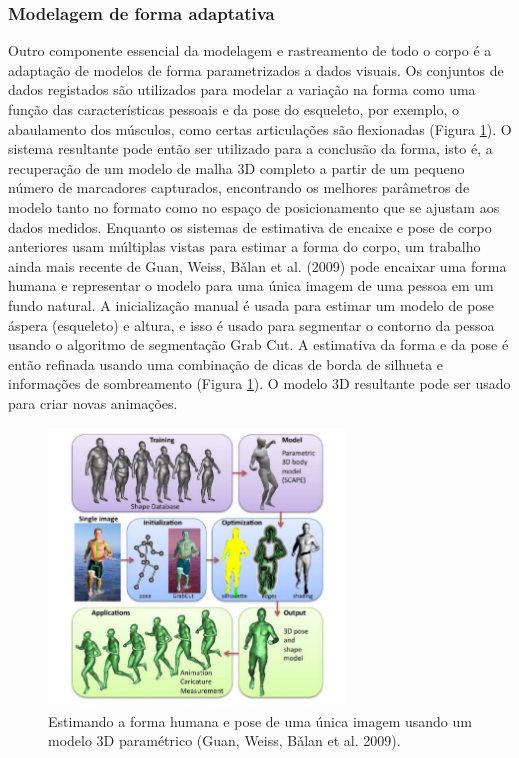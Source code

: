 \documentclass{article}
\begin{document}
\subsubsection{Modelagem de forma adaptativa}
Outro componente essencial da modelagem e rastreamento de todo o corpo é a adaptação de modelos de forma parametrizados a dados visuais. Os conjuntos de dados registados são utilizados para modelar a variação na forma como uma função das características pessoais e da pose do esqueleto, por exemplo, o abaulamento dos músculos, como certas articulações são flexionadas (Figura \ref{fig:img8}). O sistema resultante pode então ser utilizado para a conclusão da forma, isto é, a recuperação de um modelo de malha 3D completo a partir de um pequeno número de marcadores capturados, encontrando os melhores parâmetros de modelo tanto no formato como no espaço de posicionamento que se ajustam aos dados medidos. Enquanto os sistemas de estimativa de encaixe e pose de corpo anteriores usam múltiplas vistas para estimar a forma do corpo, um trabalho ainda mais recente de Guan, Weiss, Bǎlan et al. (2009) pode encaixar uma forma humana e representar o modelo para uma única imagem de uma pessoa em um fundo natural. A inicialização manual é usada para estimar um modelo de pose áspera (esqueleto) e altura, e isso é usado para segmentar o contorno da pessoa usando o algoritmo de segmentação Grab Cut. A estimativa da forma e da pose é então refinada usando uma combinação de dicas de borda de silhueta e informações de sombreamento (Figura \ref{fig:img8}). O modelo 3D resultante pode ser usado para criar novas animações.


\begin{figure}[!htb]
    \centering
    \includegraphics[width=0.7\textwidth]{img7.png}
    \caption{Estimando a forma humana e pose de uma única imagem usando um modelo 3D paramétrico (Guan, Weiss, Bǎlan et al. 2009).
}
    \label{fig:img8}
\end{figure}
\end{document}
